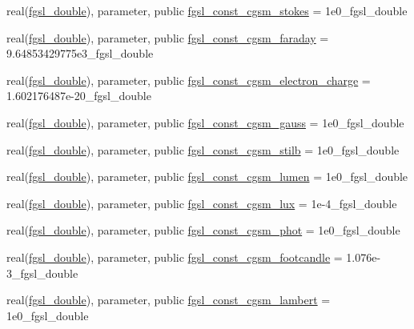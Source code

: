 \begin{DoxyCompactItemize}
\item 
real(\hyperlink{namespacefgsl_a9af5113378e0f000eb479d3f90196ddf}{fgsl\+\_\+double}), parameter, public \hyperlink{namespacefgsl_a3d38806d98751c252e4450fb1df5b246}{fgsl\+\_\+const\+\_\+cgsm\+\_\+stokes} = 1e0\+\_\+fgsl\+\_\+double
\item 
real(\hyperlink{namespacefgsl_a9af5113378e0f000eb479d3f90196ddf}{fgsl\+\_\+double}), parameter, public \hyperlink{namespacefgsl_a147d94db9ca3b698ccb636b75b27484e}{fgsl\+\_\+const\+\_\+cgsm\+\_\+faraday} = 9.\+64853429775e3\+\_\+fgsl\+\_\+double
\item 
real(\hyperlink{namespacefgsl_a9af5113378e0f000eb479d3f90196ddf}{fgsl\+\_\+double}), parameter, public \hyperlink{namespacefgsl_a5dafed1eec73194b34fc66d1e9337dc3}{fgsl\+\_\+const\+\_\+cgsm\+\_\+electron\+\_\+charge} = 1.\+602176487e-\/20\+\_\+fgsl\+\_\+double
\item 
real(\hyperlink{namespacefgsl_a9af5113378e0f000eb479d3f90196ddf}{fgsl\+\_\+double}), parameter, public \hyperlink{namespacefgsl_af917fb04d607724208d74a65a71644fe}{fgsl\+\_\+const\+\_\+cgsm\+\_\+gauss} = 1e0\+\_\+fgsl\+\_\+double
\item 
real(\hyperlink{namespacefgsl_a9af5113378e0f000eb479d3f90196ddf}{fgsl\+\_\+double}), parameter, public \hyperlink{namespacefgsl_a8f6eb902874b66bc00a4959e7444cb1a}{fgsl\+\_\+const\+\_\+cgsm\+\_\+stilb} = 1e0\+\_\+fgsl\+\_\+double
\item 
real(\hyperlink{namespacefgsl_a9af5113378e0f000eb479d3f90196ddf}{fgsl\+\_\+double}), parameter, public \hyperlink{namespacefgsl_a754f063aac1363ab86693605311aeaf8}{fgsl\+\_\+const\+\_\+cgsm\+\_\+lumen} = 1e0\+\_\+fgsl\+\_\+double
\item 
real(\hyperlink{namespacefgsl_a9af5113378e0f000eb479d3f90196ddf}{fgsl\+\_\+double}), parameter, public \hyperlink{namespacefgsl_aba54a122b0e64f01ac54513a4a0f6a9f}{fgsl\+\_\+const\+\_\+cgsm\+\_\+lux} = 1e-\/4\+\_\+fgsl\+\_\+double
\item 
real(\hyperlink{namespacefgsl_a9af5113378e0f000eb479d3f90196ddf}{fgsl\+\_\+double}), parameter, public \hyperlink{namespacefgsl_a97e19ca0cdcef10fb78328e155bc5671}{fgsl\+\_\+const\+\_\+cgsm\+\_\+phot} = 1e0\+\_\+fgsl\+\_\+double
\item 
real(\hyperlink{namespacefgsl_a9af5113378e0f000eb479d3f90196ddf}{fgsl\+\_\+double}), parameter, public \hyperlink{namespacefgsl_ab94d2a4bddeb2056b97285714a740131}{fgsl\+\_\+const\+\_\+cgsm\+\_\+footcandle} = 1.\+076e-\/3\+\_\+fgsl\+\_\+double
\item 
real(\hyperlink{namespacefgsl_a9af5113378e0f000eb479d3f90196ddf}{fgsl\+\_\+double}), parameter, public \hyperlink{namespacefgsl_a9dcbf51e3d416e2da01a503e5ba573bc}{fgsl\+\_\+const\+\_\+cgsm\+\_\+lambert} = 1e0\+\_\+fgsl\+\_\+double

\end{DoxyCompactItemize}
